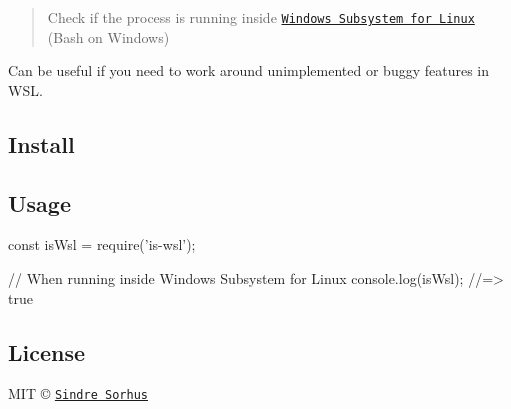 \begin{quote}
Check if the process is running inside \href{https://msdn.microsoft.com/commandline/wsl/about}{\tt Windows Subsystem for Linux} (Bash on Windows) \end{quote}


Can be useful if you need to work around unimplemented or buggy features in W\+SL.

\subsection*{Install}




\subsection*{Usage}


\begin{DoxyCode}
const isWsl = require('is-wsl');

// When running inside Windows Subsystem for Linux
console.log(isWsl);
//=> true
\end{DoxyCode}


\subsection*{License}

M\+IT © \href{https://sindresorhus.com}{\tt Sindre Sorhus} 